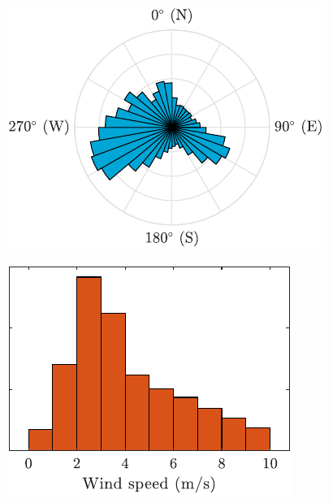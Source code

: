 \documentclass[wind]{tudposter} %
\begin{document}
\begin{multicols}{2}
\begin{minipage}{\linewidth}
	\centering
	\vspace{5mm}
	\begin{minipage}[b]{.55\linewidth}
	\includegraphics[width=\textwidth]{images/histogram_wd.pdf}
	\end{minipage}
	\begin{minipage}[b]{.42\linewidth}
	\includegraphics[width=\textwidth]{images/histogram_ws.pdf}	
	\end{minipage}
	\vspace{2cm}
\end{minipage}


\end{multicols}
\end{document}
